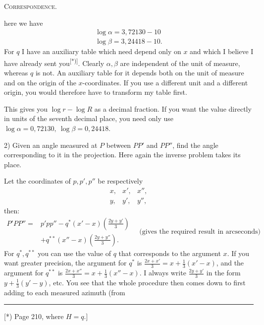 \par\clearpage
{}\hfill\textsc{Correspondence.}\hfill\mbox{}\par\medskip
\noindent here we have
\[
\begin{array}{l}
\log\alpha=3{,}72130-10\\
\log\beta=3{,}24418-10.
\end{array}
\]
For \(q\) I have an auxiliary table which need depend only on \(x\) and which I believe I have already sent you\textsuperscript{[*)]}. Clearly \(\alpha,\beta\) are independent of the unit of measure, whereas \(q\) is not. An auxiliary table for it depends both on the unit of measure and on the origin of the \(x\)-coordinates. If you use a different unit and a different origin, you would therefore have to transform my table first.

This gives you \(\log r-\log R\) as a decimal fraction. If you want the value directly in units of the seventh decimal place, you need only use \(\log\alpha=0{,}72130,\ \log\beta=0{,}24418\).

2) Given an angle measured at \(P\) between \(PP'\) and \(PP''\), find the angle corresponding to it in the projection. Here again the inverse problem takes its place.
\begin{center}
\end{center}
Let the coordinates of \(p,p',p''\) be respectively
\[
\begin{array}{ccc}x,&x',&x'',\\y,&y',&y'',\end{array}
\]
\noindent then:
\[
\begin{aligned}
P'PP''={}&p'pp''-q^*(x'-x)\left(\frac{2y+y'}3\right)\\
&+q^{**}(x''-x)\left(\frac{2y+y''}3\right).
\end{aligned}
\quad\text{(gives the required result in arcseconds)}
\]
For \(q^*,q^{**}\) you can use the value of \(q\) that corresponds to the argument \(x\). If you want greater precision, the argument for \(q^*\) is \(\frac{2x+x'}3=x+\frac13(x'-x)\), and the argument for \(q^{**}\) is \(\frac{2x+x''}3=x+\frac13(x''-x)\). I always write \(\frac{2y+y'}3\) in the form \(y+\frac13(y'-y)\), etc. You see that the whole procedure then comes down to first adding to each measured azimuth (from
\par\noindent\rule{4cm}{.4pt}\par
{\footnotesize\noindent\hspace*{\parindent}[*) Page 210, where \(H=q\).]\par}

